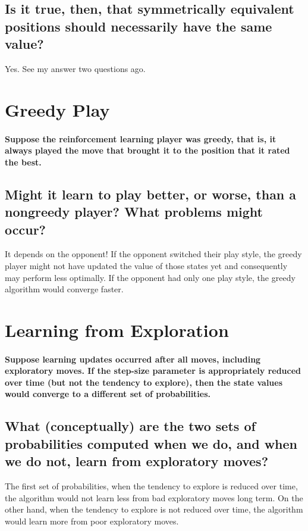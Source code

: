 \documentclass{article}
\begin{document}
\subsection{Is it true, then, that symmetrically equivalent positions should necessarily have the same value?}
Yes. See my answer two questions ago.

\section{Greedy Play}
\paragraph{Suppose the reinforcement learning player was greedy, that is, it always played the move that brought it to the position that it rated the best.}
\subsection{Might it learn to play better, or worse, than a nongreedy player? What problems might occur?}
It depends on the opponent! If the opponent switched their play style, the greedy player might not have updated the value of those states yet and consequently may perform less optimally.  If the opponent had only one play style, the greedy algorithm would converge faster.

\section{Learning from Exploration}
\paragraph{Suppose learning updates occurred after all moves, including exploratory moves. If the step-size parameter is appropriately reduced over time (but not the tendency to explore), then the state values would converge to a different set of probabilities.}
\subsection{What (conceptually) are the two sets of probabilities computed when we do, and when we do not, learn from exploratory moves?}
The first set of probabilities, when the tendency to explore is reduced over time, the algorithm would not learn less from bad exploratory moves long term.  On the other hand, when the tendency to explore is not reduced over time, the algorithm would learn more from poor exploratory moves.
\end{document}
